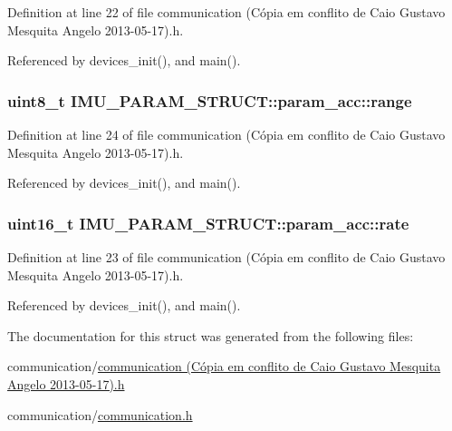 Definition at line 22 of file communication (\-Cópia em conflito de Caio Gustavo Mesquita Angelo 2013-\/05-\/17).\-h.



Referenced by devices\-\_\-init(), and main().

\hypertarget{structIMU__PARAM__STRUCT_1_1param__acc_a26199b298ef2d353192dfbc706bce8cf}{
\subsubsection[{range}]{\setlength{\rightskip}{0pt plus 5cm}uint8\-\_\-t I\-M\-U\-\_\-\-P\-A\-R\-A\-M\-\_\-\-S\-T\-R\-U\-C\-T\-::param\-\_\-acc\-::range}}\label{structIMU__PARAM__STRUCT_1_1param__acc_a26199b298ef2d353192dfbc706bce8cf}


Definition at line 24 of file communication (\-Cópia em conflito de Caio Gustavo Mesquita Angelo 2013-\/05-\/17).\-h.



Referenced by devices\-\_\-init(), and main().

\hypertarget{structIMU__PARAM__STRUCT_1_1param__acc_a30e6a318cad098cd8379416705820f95}{
\subsubsection[{rate}]{\setlength{\rightskip}{0pt plus 5cm}uint16\-\_\-t I\-M\-U\-\_\-\-P\-A\-R\-A\-M\-\_\-\-S\-T\-R\-U\-C\-T\-::param\-\_\-acc\-::rate}}\label{structIMU__PARAM__STRUCT_1_1param__acc_a30e6a318cad098cd8379416705820f95}


Definition at line 23 of file communication (\-Cópia em conflito de Caio Gustavo Mesquita Angelo 2013-\/05-\/17).\-h.



Referenced by devices\-\_\-init(), and main().



The documentation for this struct was generated from the following files\-:\begin{DoxyCompactItemize}
\item 
communication/\hyperlink{communication_01_07C_xC3_xB3pia_01em_01conflito_01de_01Caio_01Gustavo_01Mesquita_01Angelo_012013-05-17_08_8h}{communication (\-Cópia em conflito de Caio Gustavo Mesquita Angelo 2013-\/05-\/17).\-h}\item 
communication/\hyperlink{communication_2communication_8h}{communication.\-h}\end{DoxyCompactItemize}
